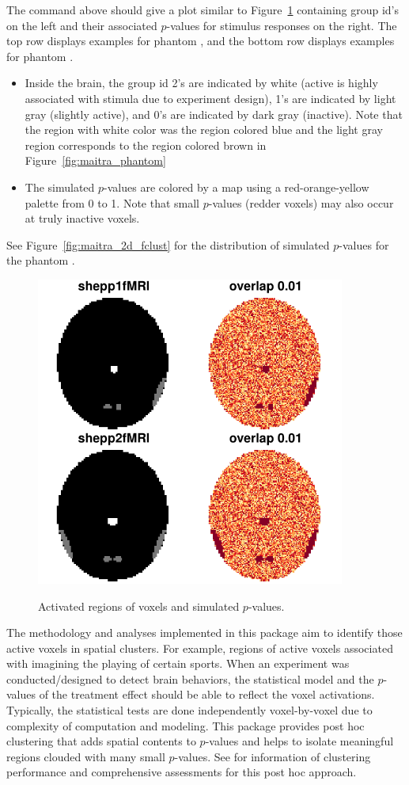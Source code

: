 The command above should give a plot similar to Figure~\ref{fig:maitra_2d}
containing group id's on the left and their associated
$p$-values for stimulus responses on the right.
The top row displays examples for phantom , and the
bottom row displays examples for phantom .
\begin{itemize}
\item
Inside the brain,
the group id 2's are indicated by white (active is highly associated with
stimula due to experiment design),
1's are indicated by light gray (slightly active),
and 0's are indicated by dark gray (inactive).
Note that the region with white color was the region colored  blue
and the light gray region corresponds to the region colored brown in
Figure~\ref{fig:maitra_phantom} 
\item
The simulated $p$-values are colored by a map using  a
red-orange-yellow palette from 0 to 1.
Note that small $p$-values (redder voxels) may also occur at truly inactive voxels.
\end{itemize}
See Figure~\ref{fig:maitra_2d_fclust} for the distribution of
simulated $p$-values for the phantom .

\begin{figure}[h]
\caption{Activated regions of voxels and simulated $p$-values.}
\centering
\vspace{0.2cm}
\includegraphics[width=4in]{./MixfMRI-include/maitra_2d}
\label{fig:maitra_2d}
\end{figure}

The methodology and analyses implemented in this package aim to 
identify those active voxels in spatial clusters. For example,
regions of active voxels associated with imagining the playing of certain
sports. 
When an experiment was conducted/designed to detect brain behaviors,
the statistical model and the $p$-values of the treatment effect
should be able to reflect the voxel activations.
Typically, the statistical tests are done independently voxel-by-voxel
due to complexity of computation and modeling.
This package provides post hoc clustering that adds spatial contents
to $p$-values and helps to isolate meaningful regions
clouded with many small $p$-values.
See \cite{ChenMaitra2018} for information of clustering performance and
comprehensive assessments for this post hoc approach.


